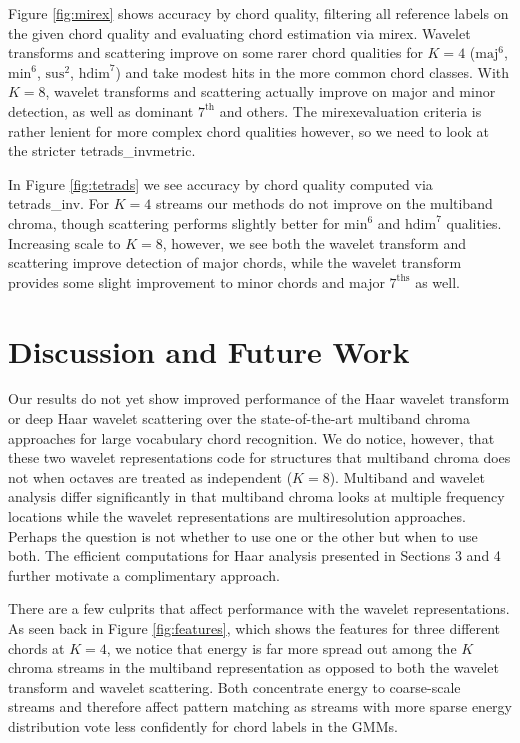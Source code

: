\documentclass{article}
\newcommand{\mirex}{mirex}
\newcommand{\tetradsinv}{tetrads\_inv}
\begin{document}
Figure \ref{fig:mirex} shows accuracy by chord quality, filtering all reference labels on the given chord quality and evaluating chord estimation via \mirex. Wavelet transforms and scattering improve on some rarer chord qualities for $K=4$
($\textrm{maj}^\textrm{6}$, $\textrm{min}^\textrm{6}$,
$\textrm{sus}^\textrm{2}$, $\textrm{hdim}^\textrm{7}$)
and take modest hits in the more common chord classes. With $K=8$, wavelet transforms and scattering actually improve on major and minor detection, as well as dominant $\textrm{7}^\textrm{th}$ and others. The \mirex evaluation criteria is rather lenient for more complex chord qualities however, so we need to look at the stricter \tetradsinv metric.

In Figure \ref{fig:tetrads} we see accuracy by chord quality computed via \tetradsinv.
For $K=4$ streams our methods do not improve on the multiband chroma,
though scattering performs slightly better for $\textrm{min}^\textrm{6}$ and $\textrm{hdim}^\textrm{7}$ qualities. Increasing scale to $K=8$, however, we see both the wavelet transform and scattering improve detection of major chords, while the wavelet transform provides some slight improvement to minor chords and major $\textrm{7}^\textrm{ths}$ as well. 
	

\section{Discussion and Future Work}\label{sec:conclusion}

Our results do not yet show improved performance of the Haar wavelet transform or deep Haar wavelet scattering over the state-of-the-art multiband chroma approaches for large vocabulary chord recognition. We do notice, however, that these two wavelet representations code for structures that multiband chroma does not when octaves are treated as independent ($K=8$). Multiband and wavelet analysis differ significantly in that multiband chroma looks at multiple frequency locations while the wavelet representations are multiresolution approaches. Perhaps the question is not whether to use one or the other but when to use both. The efficient computations for Haar analysis presented in Sections 3 and 4 further motivate a complimentary approach.

There are a few culprits that affect performance with the wavelet representations. As seen back in Figure \ref{fig:features}, which shows the features for three different chords at $K=4$, we notice that energy is far more spread out among the $K$ chroma streams in the multiband representation as opposed to both the wavelet transform and wavelet scattering. Both concentrate energy to coarse-scale streams and therefore affect pattern matching as streams with more sparse energy distribution vote less confidently for chord labels in the GMMs. %
\end{document}
